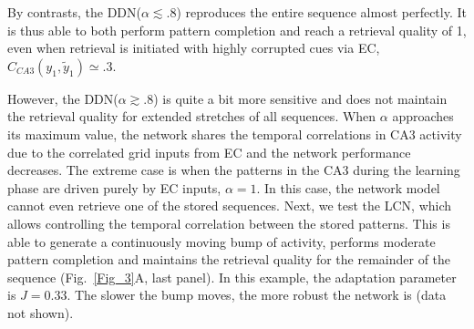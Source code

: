 \documentclass[utf8]{frontiersSCNS} %
\begin{document}
By contrasts, the DDN($\alpha \lesssim .8$) reproduces the entire sequence almost perfectly. It is thus able to both perform pattern completion and reach a retrieval quality of 1, even when retrieval is initiated with highly corrupted cues via EC, $C_{CA3} (y_1, \tilde{y}_1) \simeq .3 $. 

However, the DDN($\alpha \gtrsim .8$) is quite a bit more sensitive and does not maintain the retrieval quality for extended stretches of all sequences. When $\alpha$ approaches its maximum value, the network shares the temporal correlations in CA3 activity due to the correlated grid inputs from EC and the network performance decreases. The extreme case is when the patterns in the CA3 during the learning phase are driven purely by EC inputs, $\alpha = 1$. In this case, the network model cannot even retrieve one of the stored sequences.
% 
Next, we test the LCN, which allows controlling the temporal correlation between the stored patterns. This is able to generate a continuously moving bump of activity, performs moderate pattern completion and maintains the retrieval quality for the remainder of the sequence (Fig.~\ref{Fig_3}A, last panel).
In this example, the adaptation parameter is $J = 0.33$. The slower the bump moves, the more robust the network is (data not shown).
\end{document}
